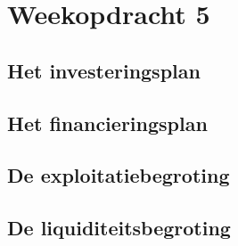 \chapter{Weekopdracht 5}



\section{Het investeringsplan}

\section{Het financieringsplan}

\section{De exploitatiebegroting}

\section{De liquiditeitsbegroting}




